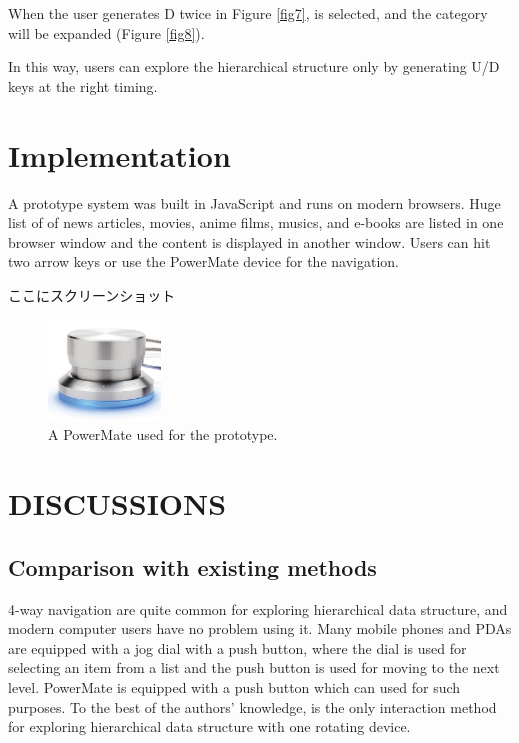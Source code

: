 \documentclass{article}
\begin{document}
When the user generates D twice in Figure \ref{fig7},
 is selected, and the category will be expanded (Figure \ref{fig8}).

In this way, users can explore the hierarchical structure
only by generating U/D keys at the right timing.

\section*{Implementation}

A prototype system was built in JavaScript and runs on modern browsers.
Huge list of of news articles, movies, anime films, musics, and e-books are listed in one browser window
and the content is displayed in another window.
Users can hit two arrow keys or use the PowerMate device for the navigation.

ここにスクリーンショット

\begin{figure}[H]
\centerline{\includegraphics[width=30mm,bb=0 0 389 348]{figures/d3a69499f7e7314ae6dc10f5bf3a2be5.png}}
\caption{A PowerMate used for the prototype.}
\label{powermate}
\end{figure}

\section*{DISCUSSIONS}

\subsection{Comparison with existing methods}

4-way navigation are quite common for exploring hierarchical data structure,
and modern computer users have no problem using it.
Many mobile phones and PDAs are equipped with a jog dial with a push button,
where the dial is used for selecting an item from a list and 
the push button is used for moving to the next level.
PowerMate is equipped with a push button which can used for such purposes.
To the best of the authors' knowledge,
{\ST} is the only interaction method for exploring hierarchical data structure
with one rotating device.
\end{document}
